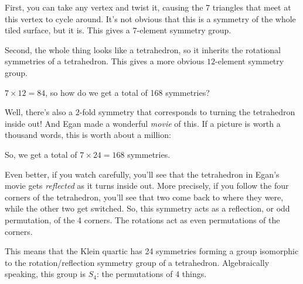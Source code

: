 \documentclass{article}
\def\tightlist{}
\renewcommand{\texttt}[1]{%
  \begingroup
  \ttfamily
  \begingroup\lccode`~=`/\lowercase{\endgroup\def~}{/\discretionary{}{}{}}%
  \begingroup\lccode`~=`[\lowercase{\endgroup\def~}{[\discretionary{}{}{}}%
  \begingroup\lccode`~=`.\lowercase{\endgroup\def~}{.\discretionary{}{}{}}%
  \catcode`/=\active\catcode`[=\active\catcode`.=\active
  \scantokens{#1\noexpand}%
  \endgroup
}
\begin{document}
First, you can take any vertex and twist it, causing the 7 triangles
that meet at this vertex to cycle around. It's not obvious that this is
a symmetry of the whole tiled surface, but it is. This gives a
\(7\)-element symmetry group.

Second, the whole thing looks like a tetrahedron, so it inherits the
rotational symmetries of a tetrahedron. This gives a more obvious
\(12\)-element symmetry group.

\(7 \times 12 = 84\), so how do we get a total of 168 symmetries?

Well, there's also a \(2\)-fold symmetry that corresponds to turning the
tetrahedron inside out! And Egan made a wonderful \emph{movie} of this.
If a picture is worth a thousand words, this is worth about a million:


So, we get a total of \(7 \times 24 = 168\) symmetries.

Even better, if you watch carefully, you'll see that the tetrahedron in
Egan's movie gets \emph{reflected} as it turns inside out. More
precisely, if you follow the four corners of the tetrahedron, you'll see
that two come back to where they were, while the other two get switched.
So, this symmetry acts as a reflection, or odd permutation, of the 4
corners. The rotations act as even permutations of the corners.

This means that the Klein quartic has 24 symmetries forming a group
isomorphic to the rotation/reflection symmetry group of a tetrahedron.
Algebraically speaking, this group is \(S_4\): the permutations of 4
things.
\end{document}
